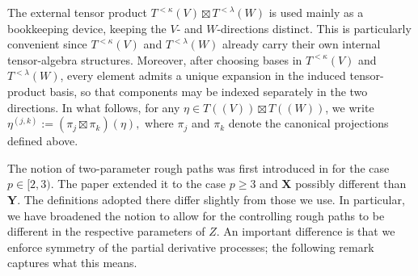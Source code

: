 \documentclass{article}%
\begin{document}
The external tensor product
\(
T^{<\kappa}(V)\boxtimes T^{<\lambda}(W)
\)
is used mainly as a bookkeeping device, keeping the \(V\)- and \(W\)-directions distinct. This is particularly convenient since \(T^{<\kappa}(V)\) and \(T^{<\lambda}(W)\) already carry their own internal tensor-algebra structures. Moreover, after choosing bases in \(T^{<\kappa}(V)\) and \(T^{<\lambda}(W)\), every element admits a unique expansion in the induced tensor-product basis, so that components may be indexed separately in the two directions.\newline
In what follows, for any $\eta\in T((V))\boxtimes T((W))$, we write
\(
\eta^{(j,k)} := (\pi_j \boxtimes \pi_k)(\eta),
\)
where $\pi_j$ and $\pi_k$ denote the canonical projections defined above.

The notion of two-parameter rough paths was first introduced in \cite{gerasimovivcs2019hormander}
for the case $p\in\lbrack2,3).$ The paper \cite{cass2023fubini} extended it to the case
\thinspace$p\geq3$ and $\mathbf{X}$ possibly different than $\mathbf{Y}$. The definitions adopted there differ slightly from those
we use. In particular, we have broadened the notion to allow for the
controlling rough paths to be different in the respective parameters of $Z.$
An important difference is that we enforce symmetry of the partial derivative
processes; the following remark captures what this means.
\end{document}
